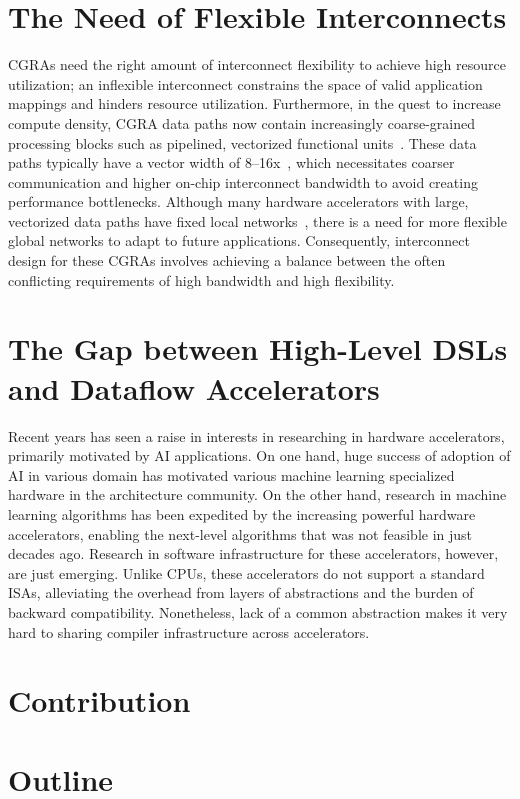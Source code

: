\section{The Need of Flexible Interconnects}
CGRAs need the right amount of interconnect flexibility to achieve high resource utilization; an inflexible interconnect constrains the space of
valid application mappings and hinders resource utilization. Furthermore, in the quest to increase compute density, CGRA data paths now 
contain increasingly coarse-grained processing blocks such as pipelined, vectorized functional units~\cite{plasticine, piperench, xilinx-acap}.
These data paths typically have a vector width of 8--16x~\cite{plasticine}, which necessitates coarser communication and higher on-chip interconnect bandwidth to avoid
creating performance bottlenecks. 
Although many hardware accelerators with large, vectorized data paths have fixed local networks~\cite{brainwave}, there is a need for more
flexible global networks to adapt to future applications.
Consequently, interconnect design for these CGRAs involves achieving a balance between the often conflicting requirements of high bandwidth and high flexibility.

\section{The Gap between High-Level DSLs and Dataflow Accelerators}
Recent years has seen a raise in interests in researching in hardware accelerators, primarily
motivated by AI applications. 
On one hand, huge success of adoption of AI in various domain has motivated various machine learning
specialized hardware in the architecture community.
On the other hand, research in machine learning algorithms has been expedited by the increasing
powerful hardware accelerators, enabling the next-level algorithms that was not feasible in just
decades ago.
Research in software infrastructure for these accelerators, however, are just emerging.
Unlike CPUs, these accelerators do not support a standard ISAs, alleviating the overhead from
layers of abstractions and the burden of backward compatibility. 
Nonetheless, lack of a common abstraction makes it very hard to sharing compiler infrastructure
across accelerators. 

\section{Contribution}
\section{Outline}
